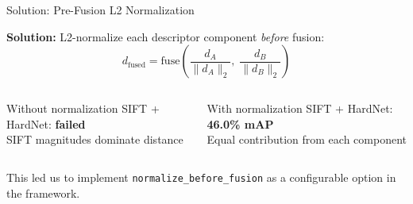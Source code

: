 \documentclass[aspectratio=169, 12pt]{beamer}
\begin{document}
\begin{frame}{Solution: Pre-Fusion L2 Normalization}

  \textbf{Solution:} L2-normalize each descriptor component \textit{before} fusion:
  \begin{equation*}
    d_{\text{fused}} = \text{fuse}\!\left(\frac{d_A}{\|d_A\|_2},\;\frac{d_B}{\|d_B\|_2}\right)
  \end{equation*}

  \begin{columns}
    \begin{block}{Without normalization}
      SIFT + HardNet: \textbf{failed}\\
      {\small SIFT magnitudes dominate distance}
    \end{block}
    \begin{block}{With normalization}
      SIFT + HardNet: \textbf{46.0\% mAP}\\
      {\small Equal contribution from each component}
    \end{block}
  \end{columns}
  \vfill
  {\small This led us to implement \texttt{normalize\_before\_fusion} as a configurable option in the framework.}
\end{frame}
\end{document}
